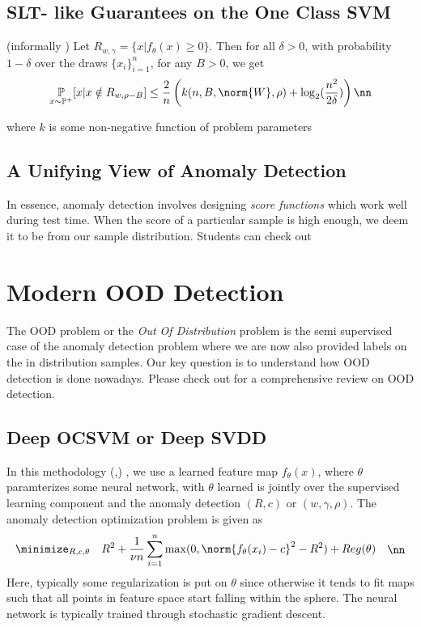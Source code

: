 \documentclass[11pt]{report}
\begin{document}
\subsection{SLT- like Guarantees on the One Class SVM}
\begin{theorem}
    (informally \cite{ScholkopfSmola2002}) Let \(R_{w,\gamma}=\{x | f_\theta(x) \geq 0\}\). Then for all \(\delta > 0 \), with probability \(1- \delta\) over the draws \(\{x_i\}_{i=1}^n\), for any \(B >0\), we get
    \begin{align}
        \underset{x \sim \mathbb{P}^+}{\mathbb{P}} [x | x \notin R_{w,\rho-B}] \leq \frac{2}{n}\left( k(n,B,\norm{W},\rho) + \log_2(\frac{n^2}{2\delta}) \right) \nn
    \end{align}
\end{theorem}
where \(k\) is some non-negative function of problem parameters

\subsection{A Unifying View of Anomaly Detection}
In essence, anomaly detection involves designing \emph{score functions} which work well during test time. When the score of a particular sample is high enough, we deem it to be from our sample distribution. Students can check out \cite{RuffKauffmannVandermeulenMontavonSamekKloftDietterichMueller2020}


\section{Modern OOD Detection}
The OOD problem or the \emph{Out Of Distribution} problem is the semi supervised case of the anomaly detection problem where we are now also provided labels on the in distribution samples. Our key question is to understand how OOD detection is done nowadays. Please check out \cite{SalehiEtAl2021} for a comprehensive review on OOD detection.

\subsection{Deep OCSVM or Deep SVDD}
In this methodology (\cite{ErfaniRajasegararKarunasekeraLeckie2016},\cite{RuffVandermeulenGoernitzDeeckeSiddiquiBinderMullerKloft2018}) , we use a learned feature map \(f_\theta(x)\), where \(\theta\) paramterizes some neural network, with \(\theta\) learned is jointly over the supervised learning component and the anomaly detection \((R,c)\) or \((w,\gamma,\rho)\). The anomaly detection optimization problem is given as 
\begin{align}
    \begin{aligned}
    &\minimize_{R,c,\theta}  && R^2+\frac{1}{\nu n}\sum_{i=1}^{n}\max (0,\norm{f_\theta(x_i)-c}^2-R^2) + Reg(\theta)
    \end{aligned}  \nn
\end{align}
Here, typically some regularization is put on \(\theta\) since otherwise it tends to fit maps such that all points in feature space  start falling within the sphere. The neural network is typically trained through stochastic gradient descent.
\end{document}
